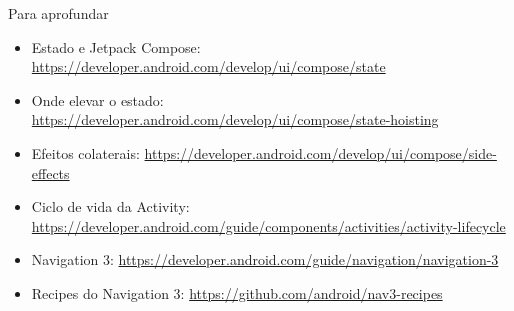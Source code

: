 \documentclass[aspectratio=169,10pt]{beamer}
\begin{document}
\begin{frame}{Para aprofundar}
  \small
  \begin{itemize}
    \item Estado e Jetpack Compose: \url{https://developer.android.com/develop/ui/compose/state}
    \item Onde elevar o estado: \url{https://developer.android.com/develop/ui/compose/state-hoisting}
    \item Efeitos colaterais: \url{https://developer.android.com/develop/ui/compose/side-effects}
    \item Ciclo de vida da Activity: \url{https://developer.android.com/guide/components/activities/activity-lifecycle}
    \item Navigation 3: \url{https://developer.android.com/guide/navigation/navigation-3}
    \item Recipes do Navigation 3: \url{https://github.com/android/nav3-recipes}
  \end{itemize}
\end{frame}

\end{document}
